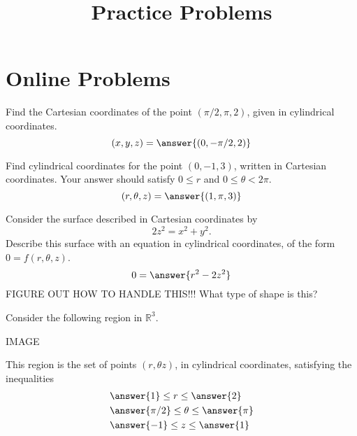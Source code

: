 \documentclass{ximera}
\title{Practice Problems}
\begin{document}
\begin{abstract}
\end{abstract}
\maketitle
\section{Online Problems}
\begin{problem}
Find the Cartesian coordinates of the point $(\pi/2, \pi, 2)$, given in cylindrical coordinates.
\[
(x,y,z) = \answer{(0, -\pi/2, 2)}
\]
\end{problem}

\begin{problem}
Find cylindrical coordinates for the point $\left(0, -1, 3\right)$, written in Cartesian coordinates. Your answer should satisfy $0\leq r$ and $0\leq \theta <2\pi$.
\[
(r, \theta, z) = \answer{(1, \pi, 3)}
\]
\end{problem}

\begin{problem}
Consider the surface described in Cartesian coordinates by
\[
2z^2 = x^2 +y^2.
\]
Describe this surface with an equation in cylindrical coordinates, of the form $0=f(r,\theta, z)$.
\[
0=\answer{r^2-2z^2}
\]
FIGURE OUT HOW TO HANDLE THIS!!!
What type of shape is this?
\begin{multipleChoice}
\end{multipleChoice}
\end{problem}

\begin{problem}
Consider the following region in $\mathbb{R}^3$.

IMAGE

This region is the set of points $(r, \theta z)$, in cylindrical coordinates, satisfying the inequalities
\begin{align*}
&\answer{1}\leq r\leq \answer{2}\\
&\answer{\pi/2}\leq\theta\leq\answer{\pi}\\
&\answer{-1}\leq z\leq\answer{1}
\end{align*}

\end{problem}
\end{document}
